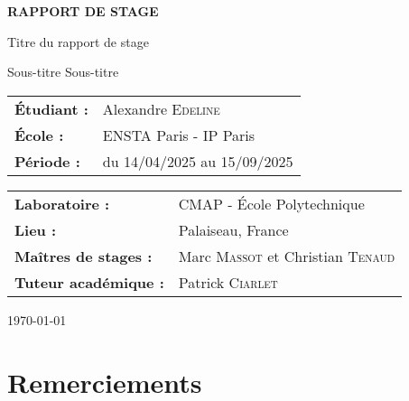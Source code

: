 \documentclass[11pt]{article}
\theoremstyle{definition}
\theoremstyle{remark}
\newcommand{\authorname}{Alexandre \textsc{Edeline}}
\newcommand{\studentschool}{ENSTA Paris - IP Paris}
\newcommand{\companyname}{CMAP - École Polytechnique}
\newcommand{\companylocation}{Palaiseau, France}
\newcommand{\supervisor}{Marc \textsc{Massot} et Christian \textsc{Tenaud}}
\newcommand{\academicsupervisor}{Patrick \textsc{Ciarlet}}
\newcommand{\internshipperiod}{du 14/04/2025 au 15/09/2025}
\newcommand{\reporttitle}{Titre du rapport de stage}
\newcommand{\reportsubtitle}{Sous-titre}
\begin{document}
\begin{titlepage}
    \centering
    
    
    \vspace{2cm}
    
    {\LARGE \textbf{RAPPORT DE STAGE}}
    
    \vspace{1cm}
    
    {\Large \reporttitle}
    
    \ifx\reportsubtitle\empty
    \else
        \vspace{0.5cm}
        {\large \reportsubtitle}
    \fi
    
    \vspace{2cm}
    
    \begin{tabular}{ll}
        \textbf{Étudiant :} & \authorname \\
        \textbf{École :} & \studentschool \\
        \textbf{Période :} & \internshipperiod \\
    \end{tabular}
    
    \vspace{2cm}
    
    \begin{tabular}{ll}
        \textbf{Laboratoire :} & \companyname \\
        \textbf{Lieu :} & \companylocation \\
        \textbf{Maîtres de stages :} & \supervisor \\
        \textbf{Tuteur académique :} & \academicsupervisor \\
    \end{tabular}
    
    \vfill
    
    
    \vspace{1cm}
    
    {\large \today}
    
\end{titlepage}

\newpage
\thispagestyle{empty}
\mbox{}

\newpage
\section*{Remerciements}
\end{document}
